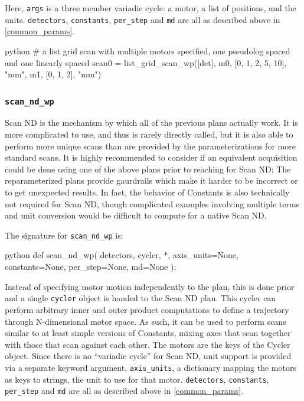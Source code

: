 Here, \texttt{args} is a three member variadic cycle: a motor, a list of positions, and the units.
\texttt{detectors}, \texttt{constants}, \texttt{per\_step} and \texttt{md} are all as described above in \ref{common_params}.

\begin{codefragment}{python}
# a list grid scan with multiple motors specified, one pseudolog spaced and one linearly spaced
scan0 = list_grid_scan_wp([det], m0, [0, 1, 2, 5, 10], "mm",
                                 m1, [0, 1, 2], "mm")
\end{codefragment}

\subsubsection{\texttt{scan\_nd\_wp}}

Scan ND is the mechanism by which all of the previous plans actually work.
It is more complicated to use, and thus is rarely directly called, but it is also able to perform more unique scans than are provided by the parameterizations for more standard scans.
It is highly recommended to consider if an equivalent acquisition could be done using one of the above plans prior to reaching for Scan ND; The reparameterized plans provide gaurdrails which make it harder to be incorrect or to get unexpected results.
In fact, the behavior of Constants is also technically not required for Scan ND, though complicated examples involving multiple terms and unit conversion would be difficult to compute for a native Scan ND.

The signature for \texttt{scan\_nd\_wp} is:

\begin{codefragment}{python}
def scan_nd_wp(
    detectors, cycler, *, axis_units=None, constants=None, per_step=None, md=None
):
\end{codefragment}

Instead of specifying motor motion independently to the plan, this is done prior and a single \texttt{cycler}\cite{} object is handed to the Scan ND plan.
This cycler can perform arbitrary inner and outer product computations to define a trajectory through N-dimensional motor space.
As such, it can be used to perform scans similar to at least simple versions of Constants, mixing axes that scan together with those that scan against each other.
The motors are the keys of the Cycler object.
Since there is no ``variadic cycle'' for Scan ND, \wrightplans unit support is provided via a separate keyword argument, \texttt{axis\_units}, a dictionary mapping the motors as keys to strings, the unit to use for that motor.
\texttt{detectors}, \texttt{constants}, \texttt{per\_step} and \texttt{md} are all as described above in \ref{common_params}.

